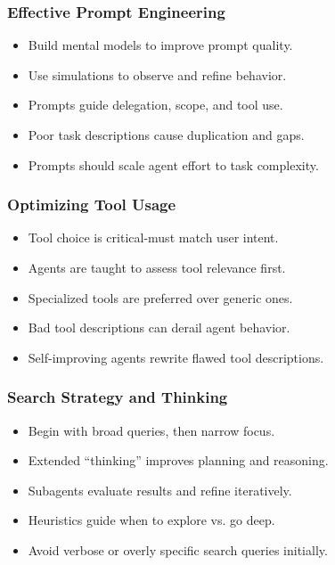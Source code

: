 \begin{frame}[fragile]\frametitle{Effective Prompt Engineering}
    \begin{itemize}
        \item Build mental models to improve prompt quality.
        \item Use simulations to observe and refine behavior.
        \item Prompts guide delegation, scope, and tool use.
        \item Poor task descriptions cause duplication and gaps.
        \item Prompts should scale agent effort to task complexity.
    \end{itemize}
\end{frame}

\begin{frame}[fragile]\frametitle{Optimizing Tool Usage}
    \begin{itemize}
        \item Tool choice is critical-must match user intent.
        \item Agents are taught to assess tool relevance first.
        \item Specialized tools are preferred over generic ones.
        \item Bad tool descriptions can derail agent behavior.
        \item Self-improving agents rewrite flawed tool descriptions.
    \end{itemize}
\end{frame}

\begin{frame}[fragile]\frametitle{Search Strategy and Thinking}
    \begin{itemize}
        \item Begin with broad queries, then narrow focus.
        \item Extended “thinking” improves planning and reasoning.
        \item Subagents evaluate results and refine iteratively.
        \item Heuristics guide when to explore vs. go deep.
        \item Avoid verbose or overly specific search queries initially.
    \end{itemize}
\end{frame}

